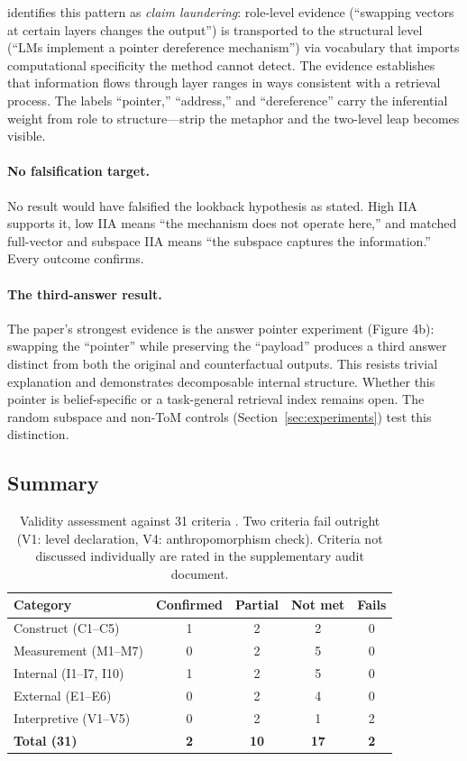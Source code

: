 \documentclass[11pt]{article}
\begin{document}
\citet{tower2026mechref} identifies this pattern as \emph{claim laundering}: role-level evidence (``swapping vectors at certain layers changes the output'') is transported to the structural level (``LMs implement a pointer dereference mechanism'') via vocabulary that imports computational specificity the method cannot detect. The evidence establishes that information flows through layer ranges in ways consistent with a retrieval process. The labels ``pointer,'' ``address,'' and ``dereference'' carry the inferential weight from role to structure---strip the metaphor and the two-level leap becomes visible.

\paragraph{No falsification target.}
No result would have falsified the lookback hypothesis as stated. High IIA supports it, low IIA means ``the mechanism does not operate here,'' and matched full-vector and subspace IIA means ``the subspace captures the information.'' Every outcome confirms.

\paragraph{The third-answer result.}
The paper's strongest evidence is the answer pointer experiment (Figure 4b): swapping the ``pointer'' while preserving the ``payload'' produces a third answer distinct from both the original and counterfactual outputs. This resists trivial explanation and demonstrates decomposable internal structure. Whether this pointer is belief-specific or a task-general retrieval index remains open. The random subspace and non-ToM controls (Section~\ref{sec:experiments}) test this distinction.

\subsection{Summary}

\begin{table}[t]
\centering
\caption{Validity assessment against 31 criteria \citep{tower2026mechval}. Two criteria fail outright (V1: level declaration, V4: anthropomorphism check). Criteria not discussed individually are rated in the supplementary audit document.}
\label{tab:validity}
\begin{tabular}{lcccc}
\toprule
Category & Confirmed & Partial & Not met & Fails \\
\midrule
Construct (C1--C5) & 1 & 2 & 2 & 0 \\
Measurement (M1--M7) & 0 & 2 & 5 & 0 \\
Internal (I1--I7, I10) & 1 & 2 & 5 & 0 \\
External (E1--E6) & 0 & 2 & 4 & 0 \\
Interpretive (V1--V5) & 0 & 2 & 1 & 2 \\
\midrule
\textbf{Total (31)} & \textbf{2} & \textbf{10} & \textbf{17} & \textbf{2} \\
\bottomrule
\end{tabular}
\end{table}
\end{document}
